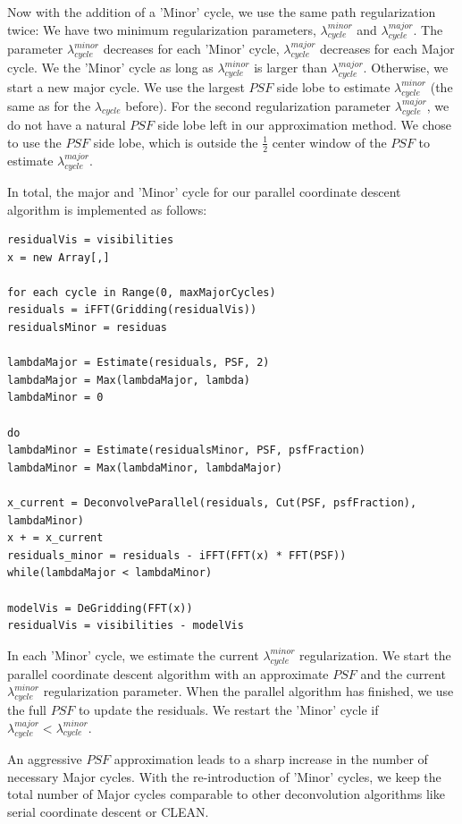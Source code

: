 Now with the addition of a 'Minor' cycle, we use the same path regularization twice: We have two minimum regularization parameters, $\lambda^{minor}_{cycle}$ and $\lambda^{major}_{cycle}$. The parameter $\lambda^{minor}_{cycle}$ decreases for each 'Minor' cycle, $\lambda^{major}_{cycle}$ decreases for each Major cycle. We  the 'Minor' cycle as long as $\lambda^{minor}_{cycle}$ is larger than $\lambda^{major}_{cycle}$. Otherwise, we start a new major cycle. We use the largest $PSF$ side lobe to estimate $\lambda^{minor}_{cycle}$ (the same as for the $\lambda_{cycle}$ before). For the second regularization parameter $\lambda^{major}_{cycle}$, we do not have a natural $PSF$ side lobe left in our approximation method. We chose to use the $PSF$ side lobe, which is outside the $\frac{1}{2}$ center window of the $PSF$ to estimate $\lambda^{major}_{cycle}$. 

In total, the major and 'Minor' cycle for our parallel coordinate descent algorithm is implemented as follows:
\begin{lstlisting}
residualVis = visibilities
x = new Array[,]

for each cycle in Range(0, maxMajorCycles)
residuals = iFFT(Gridding(residualVis))
residualsMinor = residuas

lambdaMajor = Estimate(residuals, PSF, 2)
lambdaMajor = Max(lambdaMajor, lambda)
lambdaMinor = 0

do
lambdaMinor = Estimate(residualsMinor, PSF, psfFraction)
lambdaMinor = Max(lambdaMinor, lambdaMajor)

x_current = DeconvolveParallel(residuals, Cut(PSF, psfFraction), lambdaMinor)
x + = x_current
residuals_minor = residuals - iFFT(FFT(x) * FFT(PSF))
while(lambdaMajor < lambdaMinor)

modelVis = DeGridding(FFT(x))
residualVis = visibilities - modelVis
\end{lstlisting}

In each 'Minor' cycle, we estimate the current $\lambda^{minor}_{cycle}$ regularization. We start the parallel coordinate descent algorithm with an approximate $PSF$ and the current $\lambda^{minor}_{cycle}$ regularization parameter. When the parallel algorithm has finished, we use the full $PSF$ to update the residuals. We restart the 'Minor' cycle if  $\lambda^{major}_{cycle} < \lambda^{minor}_{cycle}$.

An aggressive $PSF$ approximation leads to a sharp increase in the number of necessary Major cycles. With the re-introduction of 'Minor' cycles, we keep the total number of Major cycles comparable to other deconvolution algorithms like serial coordinate descent or CLEAN.

